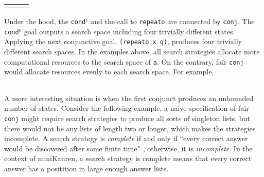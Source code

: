 \documentclass[format=acmlarge, review=true, authordraft=true]{acmart}
\newcommand{\conde}{\texttt{cond$^e$}}
\newcommand{\conj}{\texttt{conj}}
\begin{document}
\begin{center}
\begin{tabular}{l|c|r}
     &
     &
     \\
\end{tabular}
\end{center}

Under the hood, the \conde{} and the call to \texttt{repeato} are connected by 
\conj{}. The \conde{} goal outputs a search space including four trivially 
different states. 
Applying the next conjunctive goal, \texttt{(repeato x q)}, produces four 
trivially different search spaces.
In the examples above, all search strategies allocate more computational 
resources to the search space of \texttt{a}. On the contrary, fair \conj{} 
would allocate resources evenly to each search space. For example,

\begin{center}
	\begin{tabular}{c}
		
	\end{tabular}
\end{center}

A more interesting situation is when the first conjunct produces an unbounded
number of states. Consider the following example, a naive specification of 
fair \conj{} 
might require search strategies to produce all sorts of singleton lists, but 
there
would not be any lists of length two or longer, which makes the strategies 
incomplete. 
A search strategy is \emph{complete} if and only if ``every correct answer 
would be discovered after some finite time'' \cite{seres1999algebra}, 
otherwise, it is \emph{incomplete}. In the 
context of miniKanren, a search strategy is complete means that every correct 
answer has a positition in large enough answer lists.


\begin{center}
	\begin{tabular}{c}
		
	\end{tabular}
\end{center}
\end{document}
